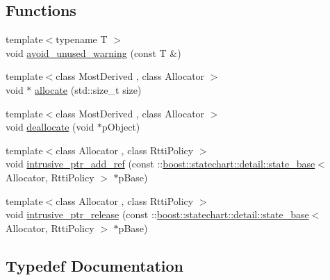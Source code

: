\subsection*{Functions}
\begin{DoxyCompactItemize}
\item 
{\footnotesize template$<$typename T $>$ }\\void \mbox{\hyperlink{namespaceboost_1_1statechart_1_1detail_a4c8f28e86a5c5c087b5a1b2e546cc93b}{avoid\+\_\+unused\+\_\+warning}} (const T \&)
\item 
{\footnotesize template$<$class Most\+Derived , class Allocator $>$ }\\void $\ast$ \mbox{\hyperlink{namespaceboost_1_1statechart_1_1detail_a23e46110b9423928f648c10933316959}{allocate}} (std\+::size\+\_\+t size)
\item 
{\footnotesize template$<$class Most\+Derived , class Allocator $>$ }\\void \mbox{\hyperlink{namespaceboost_1_1statechart_1_1detail_a2137e00f346972cc349b4eb44a806213}{deallocate}} (void $\ast$p\+Object)
\item 
{\footnotesize template$<$class Allocator , class Rtti\+Policy $>$ }\\void \mbox{\hyperlink{namespaceboost_1_1statechart_1_1detail_ae61199991db81ca38c21e4b657993be5}{intrusive\+\_\+ptr\+\_\+add\+\_\+ref}} (const \+::\mbox{\hyperlink{classboost_1_1statechart_1_1detail_1_1state__base}{boost\+::statechart\+::detail\+::state\+\_\+base}}$<$ Allocator, Rtti\+Policy $>$ $\ast$p\+Base)
\item 
{\footnotesize template$<$class Allocator , class Rtti\+Policy $>$ }\\void \mbox{\hyperlink{namespaceboost_1_1statechart_1_1detail_a783126c1ee44ec8984ee4d89b0aa1eac}{intrusive\+\_\+ptr\+\_\+release}} (const \+::\mbox{\hyperlink{classboost_1_1statechart_1_1detail_1_1state__base}{boost\+::statechart\+::detail\+::state\+\_\+base}}$<$ Allocator, Rtti\+Policy $>$ $\ast$p\+Base)
\end{DoxyCompactItemize}


\subsection{Typedef Documentation}
\mbox{\label{namespaceboost_1_1statechart_1_1detail_a3bedea0b807a16fa222733417183d2c9}} 
